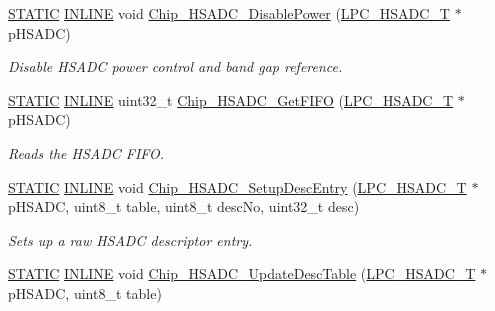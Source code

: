 \begin{DoxyCompactItemize}
\hyperlink{group___l_p_c___types___public___macros_ga10b2d890d871e1489bb02b7e70d9bdfb}{S\+T\+A\+T\+IC} \hyperlink{spifi__18xx__43xx_8h_a2eb6f9e0395b47b8d5e3eeae4fe0c116}{I\+N\+L\+I\+NE} void \hyperlink{group___h_s_a_d_c__18_x_x__43_x_x_gadc1d32d51f7740e560ba04c3d770afa2}{Chip\+\_\+\+H\+S\+A\+D\+C\+\_\+\+Disable\+Power} (\hyperlink{struct_l_p_c___h_s_a_d_c___t}{L\+P\+C\+\_\+\+H\+S\+A\+D\+C\+\_\+T} $\ast$p\+H\+S\+A\+DC)
\begin{DoxyCompactList}\small\item\em Disable H\+S\+A\+DC power control and band gap reference. \end{DoxyCompactList}\item 
\hyperlink{group___l_p_c___types___public___macros_ga10b2d890d871e1489bb02b7e70d9bdfb}{S\+T\+A\+T\+IC} \hyperlink{spifi__18xx__43xx_8h_a2eb6f9e0395b47b8d5e3eeae4fe0c116}{I\+N\+L\+I\+NE} uint32\+\_\+t \hyperlink{group___h_s_a_d_c__18_x_x__43_x_x_ga0c89dc698fbb5f5c70b471bad3c15ae4}{Chip\+\_\+\+H\+S\+A\+D\+C\+\_\+\+Get\+F\+I\+FO} (\hyperlink{struct_l_p_c___h_s_a_d_c___t}{L\+P\+C\+\_\+\+H\+S\+A\+D\+C\+\_\+T} $\ast$p\+H\+S\+A\+DC)
\begin{DoxyCompactList}\small\item\em Reads the H\+S\+A\+DC F\+I\+FO. \end{DoxyCompactList}\item 
\hyperlink{group___l_p_c___types___public___macros_ga10b2d890d871e1489bb02b7e70d9bdfb}{S\+T\+A\+T\+IC} \hyperlink{spifi__18xx__43xx_8h_a2eb6f9e0395b47b8d5e3eeae4fe0c116}{I\+N\+L\+I\+NE} void \hyperlink{group___h_s_a_d_c__18_x_x__43_x_x_gaaa3661b82ab37e1cb31e248713451705}{Chip\+\_\+\+H\+S\+A\+D\+C\+\_\+\+Setup\+Desc\+Entry} (\hyperlink{struct_l_p_c___h_s_a_d_c___t}{L\+P\+C\+\_\+\+H\+S\+A\+D\+C\+\_\+T} $\ast$p\+H\+S\+A\+DC, uint8\+\_\+t table, uint8\+\_\+t desc\+No, uint32\+\_\+t desc)
\begin{DoxyCompactList}\small\item\em Sets up a raw H\+S\+A\+DC descriptor entry. \end{DoxyCompactList}\item 
\hyperlink{group___l_p_c___types___public___macros_ga10b2d890d871e1489bb02b7e70d9bdfb}{S\+T\+A\+T\+IC} \hyperlink{spifi__18xx__43xx_8h_a2eb6f9e0395b47b8d5e3eeae4fe0c116}{I\+N\+L\+I\+NE} void \hyperlink{group___h_s_a_d_c__18_x_x__43_x_x_ga61445a76cda41f938d5be8f291caa520}{Chip\+\_\+\+H\+S\+A\+D\+C\+\_\+\+Update\+Desc\+Table} (\hyperlink{struct_l_p_c___h_s_a_d_c___t}{L\+P\+C\+\_\+\+H\+S\+A\+D\+C\+\_\+T} $\ast$p\+H\+S\+A\+DC, uint8\+\_\+t table)

\end{DoxyCompactItemize}
